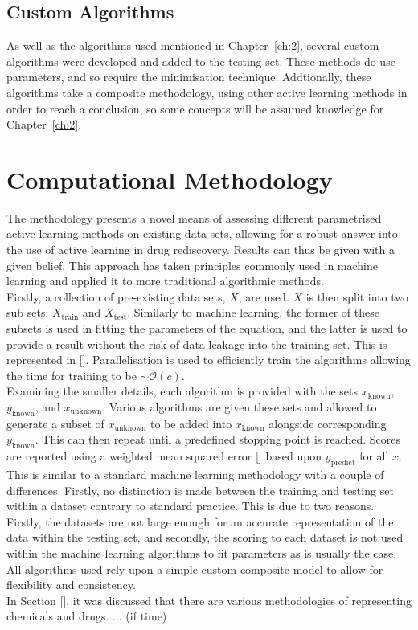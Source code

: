 \subsection{Custom Algorithms}
As well as the algorithms used mentioned in Chapter~\ref{ch:2}, several custom algorithms were developed and added to the testing set. These methods do use parameters, and so require the minimisation technique. Addtionally, these algorithms take a composite methodology, using other active learning methods in order to reach a conclusion, so some concepts will be assumed knowledge for Chapter~\ref{ch:2}.

\section{Computational Methodology}
The methodology presents a novel means of assessing different parametrised active learning methods on existing data sets, allowing for a robust answer into the use of active learning in drug rediscovery. Results can thus be given with a given belief. This approach has taken principles commonly used in machine learning and applied it to more traditional algorithmic methods.
\\
Firstly, a collection of pre-existing data sets, $X$, are used. $X$ is then split into two sub sets: $X_{\mathrm{train}}$ and $X_\mathrm{test}$. Similarly to machine learning, the former of these subsets is used in fitting the parameters of the equation, and the latter is used to provide a result without the risk of data leakage into the training set. This is represented in []. Parallelisation is used to efficiently train the algorithms allowing the time for training to be $\sim{}\mathcal{O}(c)$.
\\
Examining the smaller details, each algorithm is provided with the sets $x_\mathrm{known}$, $y_\mathrm{known}$, and $x_\mathrm{unknown}$. Various algorithms are given these sets and allowed to generate a subset of $x_\mathrm{unknown}$ to be added into $x_\mathrm{known}$ alongside corresponding $y_\mathrm{known}$. This can then repeat until a predefined stopping point is reached. Scores are reported using a weighted mean squared error [] based upon $y_\mathrm{predict}$ for all $x$. This is similar to a standard machine learning methodology with a couple of differences. Firstly, no distinction is made between the training and testing set within a dataset contrary to standard practice. This is due to two reasons. Firstly, the datasets are not large enough for an accurate representation of the data within the testing set, and secondly, the scoring to each dataset is not used within the machine learning algorithms to fit parameters as is usually the case. All algorithms used rely upon a simple custom composite model to allow for flexibility and consistency.
\\
In Section [], it was discussed that there are various methodologies of representing chemicals and drugs. ... (if time)


